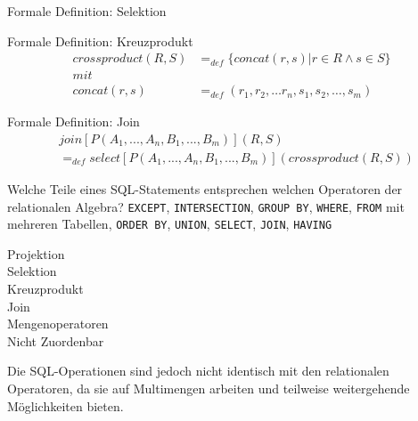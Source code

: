 \begin{frame}{Formale Definition: Selektion}
\end{frame}

\begin{frame}{Formale Definition: Kreuzprodukt}
\begin{align*}
crossproduct(R, S) &= _{def} \{concat (r, s) | r \in R \wedge s \in S\} \\
mit\\
concat(r, s) &=_{def} (r_1, r_2, \ldots r_n, s_1, s_2, \ldots, s_m)
\end{align*}
\end{frame}

\begin{frame}{Formale Definition: Join}
\begin{align*}
&join[P (A_1, ... , A_n, B_1, ... , B_m)](R, S) \\
&= _{def} select [P (A_1, ... , A_n, B_1, ... , B_m)] (crossproduct (R, S))
\end{align*}
\end{frame}

\begin{frame}{Welche Teile eines SQL-Statements entsprechen welchen Operatoren der relationalen Algebra?}
\texttt{EXCEPT},
\texttt{INTERSECTION},
\texttt{GROUP BY},
\texttt{WHERE},
\texttt{FROM} mit mehreren Tabellen,
\texttt{ORDER BY},
\texttt{UNION},
\texttt{SELECT},
\texttt{JOIN},
\texttt{HAVING}
\begin{description}
\item[Projektion] 
\item[Selektion] 
\item[Kreuzprodukt] 
\item[Join] 
\item[Mengenoperatoren] 
\item[Nicht Zuordenbar] 
\end{description}
Die SQL-Operationen sind jedoch nicht identisch mit den relationalen Operatoren, da sie auf Multimengen arbeiten und teilweise weitergehende Möglichkeiten bieten.
\end{frame}

